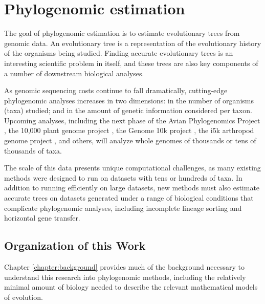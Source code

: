 \documentclass[tocnosub,noragright,centerchapter,fullpagesingle,12pt]{uiuc_csthesis18}
\begin{document}
%
\tableofcontents

\mainmatter

%

%
%

\flushbottom

\chapter{Phylogenomic estimation}


The goal of phylogenomic estimation is to estimate evolutionary trees
from genomic data. An evolutionary tree is a representation of the
evolutionary history of the organisms being studied. Finding accurate
evolutionary trees is an interesting scientific problem in itself, and
these trees are also key components of a number of downstream
biological analyses.

As genomic sequencing costs continue to fall dramatically,
cutting-edge phylogenomic analyses increases in two dimensions: in the
number of organisms (taxa) studied; and in the amount of genetic
information considered per taxon. Upcoming analyses, including the
next phase of the Avian Phylogenomics Project \cite{zhang2015genomics}, the 10,000 plant
genome project \cite{cheng201810kp}, the Genome 10k project \cite{koepfli2015genome}, the i5k
arthropod genome project \cite{levine2011i5k}, and others, will analyze whole
genomes of thousands or tens of thousands of taxa.

The scale of this data presents unique computational challenges, as
many existing methods were designed to run on datasets with tens or
hundreds of taxa. In addition to running efficiently on large
datasets, new methods must also estimate accurate trees on datasets
generated under a range of biological conditions that complicate
phylogenomic analyses, including incomplete lineage sorting and
horizontal gene transfer.

\section*{Organization of this Work}

Chapter \ref{chapter:background} provides much of the background
necessary to understand this research into phylogenomic methods,
including the relatively minimal amount of biology needed to describe
the relevant mathematical models of evolution.
\end{document}
